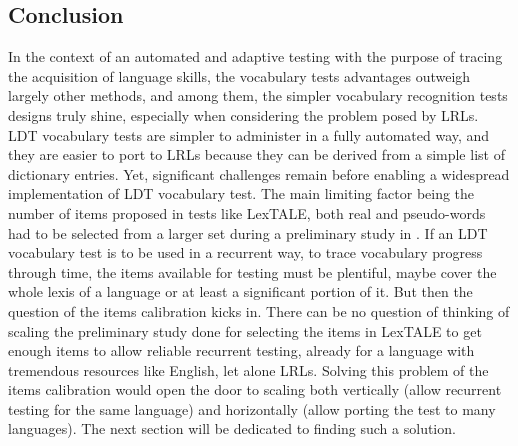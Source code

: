 
    \subsection{Conclusion}
In the context of an automated and adaptive testing with the purpose of tracing the acquisition of language skills, the vocabulary tests advantages outweigh largely other methods, and among them, the simpler vocabulary recognition tests designs truly shine, especially when considering the problem posed by LRLs. LDT vocabulary tests are simpler to administer in a fully automated way, and they are easier to port to LRLs because they can be derived from a simple list of dictionary entries. Yet, significant challenges remain before enabling a widespread implementation of LDT vocabulary test. The main limiting factor being the number of items proposed in tests like LexTALE, both real and pseudo-words had to be selected from a larger set during a preliminary study in \parencite{lemhofer_introducing_2012}. If an LDT vocabulary test is to be used in a recurrent way, to trace vocabulary progress through time, the items available for testing must be plentiful, maybe cover the whole lexis of a language or at least a significant portion of it. But then the question of the items calibration kicks in. There can be no question of thinking of scaling the preliminary study done for selecting the items in LexTALE to get enough items to allow reliable recurrent testing, already for a language with tremendous resources like English, let alone LRLs. Solving this problem of the items calibration would open the door to scaling both vertically (allow recurrent testing for the same language) and horizontally (allow porting the test to many languages). The next section will be dedicated to finding such a solution.

